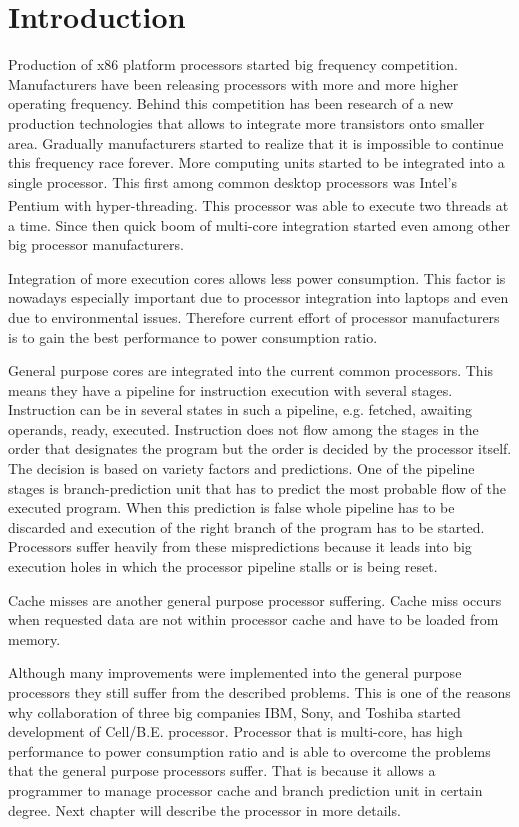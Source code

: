 ﻿\chapter{Introduction}

Production of x86 platform processors started big frequency competition.
Manufacturers have been releasing processors with more and more higher operating frequency.
Behind this competition has been research of a new production technologies that allows to integrate more transistors onto smaller area.
Gradually manufacturers started to realize that it is impossible to continue this frequency race forever.
More computing units started to be integrated into a single processor.
This first among common desktop processors was Intel's Pentium\textsuperscript{\textregistered} with hyper-threading.
This processor was able to execute two threads at a time.
Since then quick boom of multi-core integration started even among other big processor manufacturers.
\par
Integration of more execution cores allows less power consumption.
This factor is nowadays especially important due to processor integration into laptops and even due to environmental issues.
Therefore current effort of processor manufacturers is to gain the best performance to power consumption ratio.

General purpose cores are integrated into the current common processors.
This means they have a pipeline for instruction execution with several stages.
Instruction can be in several states in such a pipeline, e.g. fetched, awaiting operands, ready, executed.
Instruction does not flow among the stages in the order that designates the program but the order is decided by the processor itself.
The decision is based on variety factors and predictions.
One of the pipeline stages is branch-prediction unit that has to predict the most probable flow of the executed program.
When this prediction is false whole pipeline has to be discarded and execution of the right branch of the program has to be started.
Processors suffer heavily from these mispredictions because it leads into big execution holes in which the processor pipeline stalls or is being reset.

Cache misses are another general purpose processor suffering.
Cache miss occurs when requested data are not within processor cache and have to be loaded from memory.

Although many improvements were implemented into the general purpose processors they still suffer from the described problems.
This is one of the reasons why collaboration of three big companies IBM, Sony, and Toshiba started development of Cell/B.E. processor.
Processor that is multi-core, has high performance to power consumption ratio and is able to overcome the problems that the general purpose processors suffer.
That is because it allows a programmer to manage processor cache and branch prediction unit in certain degree.
Next chapter will describe the processor in more details.

